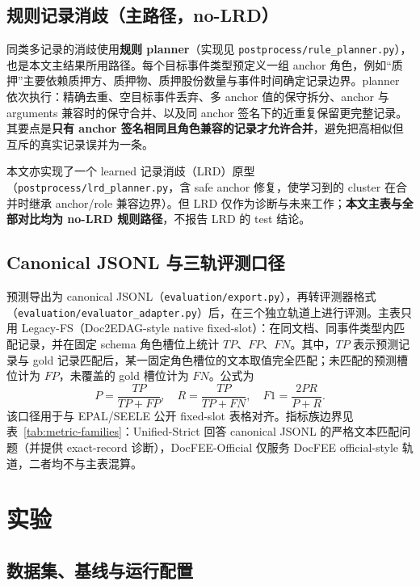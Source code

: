 \documentclass[UTF8,fontset=none,11pt]{ctexart}
\begin{document}
\subsection{规则记录消歧（主路径，no-LRD）}

同类多记录的消歧使用\textbf{规则 planner}（实现见 \texttt{postprocess/rule\_planner.py}），也是本文主结果所用路径。每个目标事件类型预定义一组 anchor 角色，例如“质押”主要依赖质押方、质押物、质押股份数量与事件时间确定记录边界。planner 依次执行：精确去重、空目标事件丢弃、多 anchor 值的保守拆分、anchor 与 arguments 兼容时的保守合并、以及同 anchor 签名下的近重复保留更完整记录。其要点是\textbf{只有 anchor 签名相同且角色兼容的记录才允许合并}，避免把高相似但互斥的真实记录误并为一条。

本文亦实现了一个 learned 记录消歧（LRD）原型（\texttt{postprocess/lrd\_planner.py}，含 safe anchor 修复，使学习到的 cluster 在合并时继承 anchor/role 兼容边界）。但 LRD 仅作为诊断与未来工作；\textbf{本文主表与全部对比均为 no-LRD 规则路径}，不报告 LRD 的 test 结论。

\subsection{Canonical JSONL 与三轨评测口径}\label{sec:metric}

预测导出为 canonical JSONL（\texttt{evaluation/export.py}），再转评测器格式（\texttt{evaluation/evaluator\_adapter.py}）后，在三个独立轨道上进行评测。主表只用 Legacy-FS（Doc2EDAG-style native fixed-slot）：在同文档、同事件类型内匹配记录，并在固定 schema 角色槽位上统计 $TP$、$FP$、$FN$。其中，$TP$ 表示预测记录与 gold 记录匹配后，某一固定角色槽位的文本取值完全匹配；未匹配的预测槽位计为 $FP$，未覆盖的 gold 槽位计为 $FN$。公式为
\[
P=\frac{TP}{TP+FP},\quad R=\frac{TP}{TP+FN},\quad F1=\frac{2PR}{P+R}.
\]
该口径用于与 EPAL/SEELE 公开 fixed-slot 表格对齐。指标族边界见表~\ref{tab:metric-families}：Unified-Strict 回答 canonical JSONL 的严格文本匹配问题（并提供 exact-record 诊断），DocFEE-Official 仅服务 DocFEE official-style 轨道，二者均不与主表混算。



\section{实验}\label{sec:exp}

\subsection{数据集、基线与运行配置}
\end{document}
